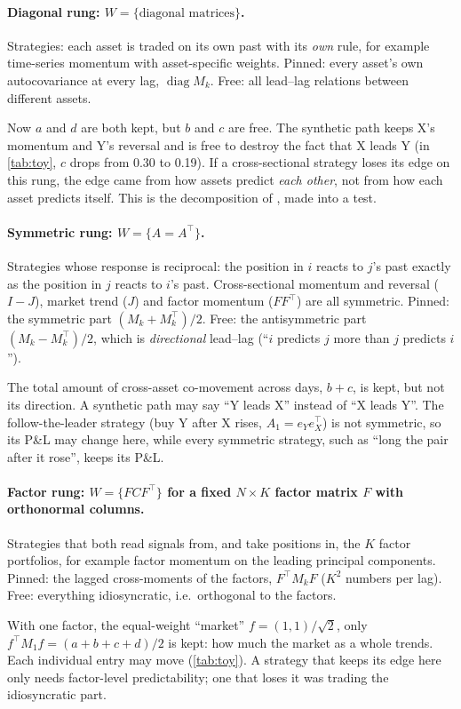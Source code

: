 \documentclass[11pt]{article}
\theoremstyle{definition}
\theoremstyle{remark}
\newcommand{\diag}{\operatorname{diag}}
\begin{document}
\paragraph{Diagonal rung: $W=\{\text{diagonal matrices}\}$.} Strategies: each asset is traded on its own past with its \emph{own} rule,
for example time-series momentum with asset-specific weights. Pinned: every asset's own autocovariance at every lag, $\diag M_k$.
Free: all lead--lag relations between different assets.
\begin{plainwords}[: diagonal]
Now $a$ and $d$ are both kept, but $b$ and $c$ are free. The synthetic path keeps X's momentum and Y's reversal and is free to destroy the
fact that X leads Y (in \cref{tab:toy}, $c$ drops from 0.30 to 0.19). If a cross-sectional strategy loses its edge on this rung, the edge came from
how assets predict \emph{each other}, not from how each asset predicts itself. This is the decomposition of \citet{lo1990}, made into a test.
\end{plainwords}

\paragraph{Symmetric rung: $W=\{A=A^\top\}$.} Strategies whose response is reciprocal: the position in $i$ reacts to $j$'s past exactly as
the position in $j$ reacts to $i$'s past. Cross-sectional momentum and reversal ($I-J$), market trend ($J$) and factor momentum ($FF^\top$) are all
symmetric. Pinned: the symmetric part $(M_k+M_k^\top)/2$. Free: the antisymmetric part $(M_k-M_k^\top)/2$, which is \emph{directional}
lead--lag (``$i$ predicts $j$ more than $j$ predicts $i$'').
\begin{plainwords}[: symmetric]
The total amount of cross-asset co-movement across days, $b+c$, is kept, but not its direction. A synthetic path may say ``Y leads X'' instead of ``X leads Y''.
The follow-the-leader strategy (buy Y after X rises, $A_1=e_Ye_X^\top$) is not symmetric, so its P\&L may change here, while every symmetric
strategy, such as ``long the pair after it rose'', keeps its P\&L.
\end{plainwords}

\paragraph{Factor rung: $W=\{FCF^\top\}$ for a fixed $N\times K$ factor matrix $F$ with orthonormal columns.} Strategies that both read signals
from, and take positions in, the $K$ factor portfolios, for example factor momentum on the leading principal components. Pinned: the lagged cross-moments
of the factors, $F^\top M_kF$ ($K^2$ numbers per lag). Free: everything idiosyncratic, i.e.\ orthogonal to the factors.
\begin{plainwords}[: factor]
With one factor, the equal-weight ``market'' $f=(1,1)/\sqrt2$, only $f^\top M_1 f=(a+b+c+d)/2$ is kept: how much the market as a whole trends.
Each individual entry may move (\cref{tab:toy}). A strategy that keeps its edge here only needs factor-level predictability; one that loses it
was trading the idiosyncratic part.
\end{plainwords}
\end{document}
